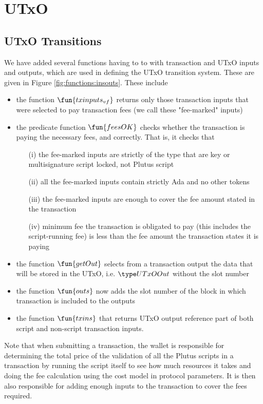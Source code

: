 \section{UTxO}
\label{sec:utxo}


\subsection{UTxO Transitions}
\label{sec:utxo-trans}

We have added several functions having to to with transaction and UTxO inputs and
outputs, which are used in defining the UTxO transition system. These are
given in Figure \ref{fig:functions:insouts}. These include

\begin{itemize}
  \item the function $\fun{txinputs_{vf}}$ returns only those transaction inputs
  that were selected to pay transaction fees (we call these "fee-marked" inputs)
  \item the predicate function $\fun{feesOK}$ checks whether the transaction is
  paying the necessary fees, and correctly. That is, it checks that
  \begin{itemize}
    \item[(i)] the fee-marked inputs are strictly of the type that are key or
    multisignature script locked, not Plutus script
    \item [(ii)] all the fee-marked inputs contain strictly Ada and no other tokens
    \item [(iii)] the fee-marked inputs are enough to cover the fee amount stated
    in the transaction
    \item [(iv)] minimum fee the transaction is obligated to pay (this includes
    the script-running fee) is less than the fee amount the transaction states
    it is paying
  \end{itemize}
  \item the function $\fun{getOut}$ selects from a transaction output the data that
  will be stored in the UTxO, i.e. $\UTxOOut$ without the slot number
  \item the function $\fun{outs}$ now adds the slot number of the block in which transaction is
  included to the outputs
  \item the function $\fun{txins}$ that returns UTxO output reference part of both script
  and non-script transaction inputs.
\end{itemize}

Note that when submitting a transaction, the wallet is responsible for
determining the total price of the
validation of all the Plutus scripts in a transaction
by running the script itself to see how much resources it takes and doing the
fee calculation using the cost model in protocol parameters. It is then
also responsible for adding enough inputs to the transaction to cover the
fees required.

